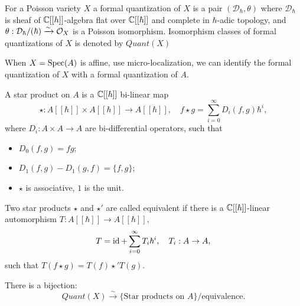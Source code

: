 
For a Poisson variety $X$ a formal quantization of $X$ is a pair $(\mathcal{D}_{\hbar},\theta)$ where $\mathcal{D}_{\hbar}$ is sheaf of $\mathbb{C}[[h]]$-algebra flat over $\mathbb{C}[[\hbar]]$ and complete in $\hbar$-adic topology, and $\theta: \mathcal{D}_{\hbar}/(\hbar) \xrightarrow{\sim} \mathcal{O}_X$ is a Poisson isomorphism. Isomorphism classes of formal quantizations of $X$ is denoted by $Quant(X)$

When $X = \operatorname{Spec}(A)$ is affine, use micro-localization, we can identify the formal quantization of $X$ with a formal quantization of $A$.

A star product on $A$ is a $\mathbb{C}[[\hbar]]$ bi-linear map
\[
  \star: A[[\hbar]] \times A[[\hbar]] \to A[[\hbar]], \quad f \star g = \sum_{i=0}^{\infty} D_i(f,g) \hbar^i,
\]  
where $D_i: A \times A \to A$ are bi-differential operators, such that
\begin{itemize}
  \item $D_0(f,g) = fg$;
  \item $D_1(f,g) - D_1(g,f) = \{f,g\}$;
  \item $\star$ is associative, $1$ is the unit.
\end{itemize}

Two star products $\star$ and $\star'$ are called equivalent if there is a $\mathbb{C}[[\hbar]]$-linear automorphism $T: A[[\hbar]] \to A[[\hbar]]$,
\[
  T = \operatorname{id} + \sum_{i=0}^{\infty} T_i \hbar^i, \quad T_i: A \to A,
\]
such that $T(f \star g) = T(f) \star' T(g)$.

\begin{thm}
  There is a bijection:
  \[
    Quant(X) \xrightarrow{\sim} \{\text{Star products on } A\}/\text{equivalence}.
  \]
\end{thm}


